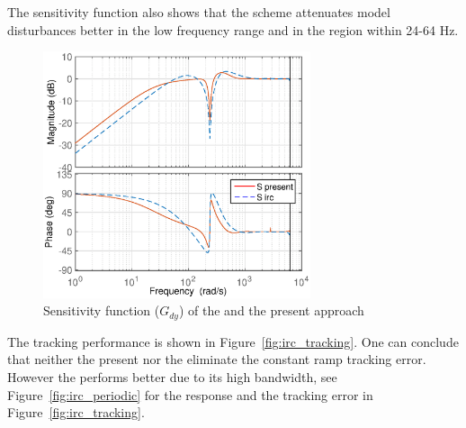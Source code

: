The \abbrIRC sensitivity function also shows that the \abbrIRC scheme attenuates model disturbances better in the low frequency range and in the region within 24-64 Hz.

\begin{figure}[h!]
  \centering
  \includegraphics[width=0.7\textwidth]{fig/matlab/sensitivity_irc.eps}
  \caption{\label{fig:sensitivity_irc}Sensitivity function ($G_{dy}$) of the \abbrIRC and the present approach}
\end{figure}

\FloatBarrier
The \abbrIRC tracking performance is shown in Figure~\ref{fig:irc_tracking}. One can conclude that neither the present nor the \abbrIRC eliminate the constant ramp tracking error. However the \abbrIRC performs better due to its high bandwidth, see Figure~\ref{fig:irc_periodic} for the response and the tracking error in Figure~\ref{fig:irc_tracking}.

